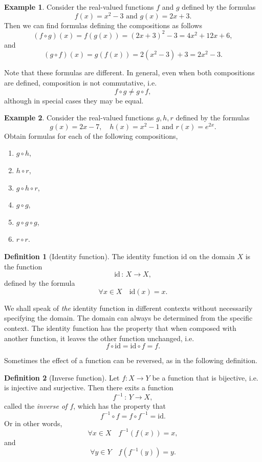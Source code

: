 \documentclass[extrafontsizes, twoside, a4paper]{memoir}
\theoremstyle{plain}%
\theoremstyle{definition}
\newtheorem{defn}{Definition}[chapter]
\newtheorem{exmp}{Example}[chapter]
\theoremstyle{remark}
\begin{document}
\begin{exmp}
Consider the real-valued functions $f$ and $g$ defined by the formulas
$$f(x) = x^2 - 3 \text{ and } g(x)=2x+3 .$$
Then we can find formulas defining the compositions as follows
$$\left ( f \circ g \right )(x) = f(g(x)) = \left ( 2x+3 \right)^2 -3 = 4x^2 +12x +6,$$
and
$$\left ( g \circ f \right )(x) = g(f(x)) = 2 \left (x^2 - 3 \right ) + 3 = 2x^2 - 3.$$
\end{exmp}
Note that these formulas are different. In general, even when both compositions are defined, composition is not commutative, i.e.
$$ f \circ g \neq g \circ f ,$$
although in special cases they may be equal.
\begin{exmp}
Consider the real-valued functions $g,h,r$ defined by the formulas
$$g(x) = 2x - 7, \quad h(x)=x^2 -1 \text{ and } r(x) = e^{2x} .$$
Obtain formulas for each of the following compositions,
\begin{enumerate}
\item
$g \circ h$,
\item
$h \circ r$,
\item
$g \circ h \circ r$,
\item
$g \circ g$,
\item
$ g \circ  g \circ g$,
\item
$r \circ r$.
\end{enumerate}
\end{exmp}

\begin{defn}[Identity function]
The identity function $\text{id}$ on the domain $X$ is the function
$$\text{id} \, : \, X \to X ,$$
defined by the formula
$$ \forall x \in X \quad \text{id}(x)=x.$$
\end{defn}

We shall speak of \textit{the} identity function in different contexts without necessarily specifying the domain. The domain can always be determined from the specific context. The identity function has the property that when composed with another function, it leaves the other function unchanged, i.e.
$$ f \circ \text{id} = \text{id} \circ f = f.$$

Sometimes the effect of a function can be reversed, as in the following definition.

\begin{defn}[Inverse function]
Let $f:X \to Y$ be a function that is bijective, i.e. is injective and surjective. Then there exits a function
$$ f^{-1} \, : \, Y \to X,$$
called the \emph{inverse of $f$}, which has the property that
$$ f^{-1} \circ f = f \circ f^{-1} = \text{id}.$$
Or in other words,
$$ \forall x \in X \quad f^{-1} ( f(x)) = x ,$$
and
$$ \forall y \in Y \quad f(f^{-1}(y)) = y .$$
\end{defn}
\end{document}
